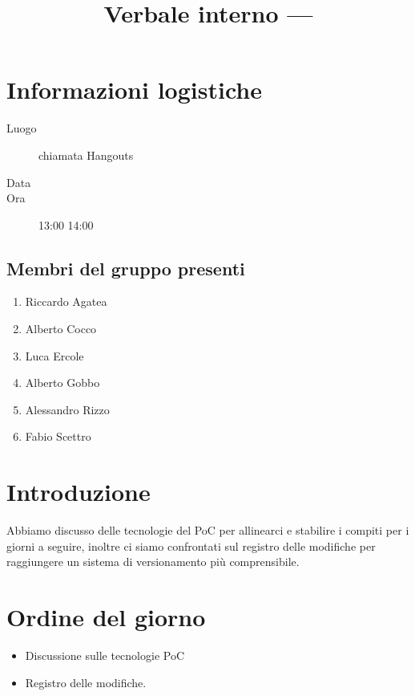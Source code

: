 \documentclass{article}
\title{Verbale interno --- \dataVerbale{}}
\begin{document}


\section{Informazioni logistiche}%
\label{sec:informazioni_logistiche}

\begin{description}
  \item [Luogo] chiamata Hangouts
  \item [Data] \dataVerbale{}
  \item [Ora] 13:00  14:00
\end{description}

\subsection{Membri del gruppo presenti}%
\label{sub:membri_del_gruppo_presenti}

\begin{enumerate}
  \item Riccardo Agatea
  \item Alberto Cocco
  \item Luca Ercole
  \item Alberto Gobbo
  \item Alessandro Rizzo
  \item Fabio Scettro
\end{enumerate}

\section{Introduzione}%
\label{sec:introduzione}

Abbiamo discusso delle tecnologie del PoC per allinearci e stabilire i compiti per i giorni a seguire, inoltre ci siamo confrontati sul registro delle modifiche per raggiungere un sistema di versionamento più comprensibile.

\section{Ordine del giorno}%
\label{sec:ordine_del_giorno}

\begin{itemize}
  \item Discussione sulle tecnologie PoC
  \item Registro delle modifiche.
\end{itemize}
\end{document}
